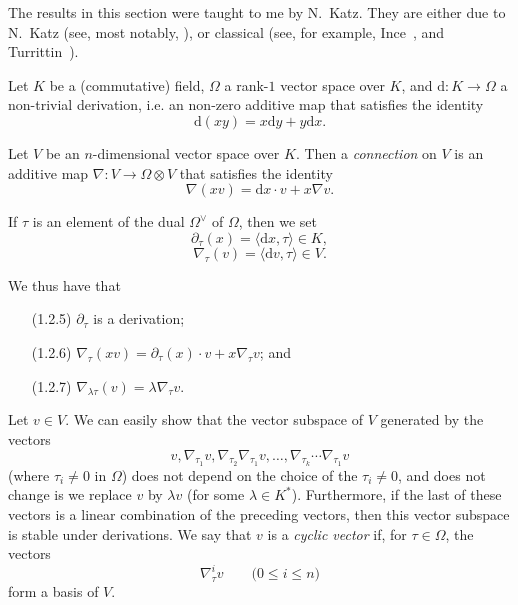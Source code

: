 \documentclass{report}
\theoremstyle{plain}
\theoremstyle{definition}
\newenvironment{env}[1]
    {\renewcommand\theinnercustomenv{#1}\innercustomenv}
    {\endinnercustomenv}
\newcommand{\dd}{\mathrm{d}}
\renewcommand{\leq}{\leqslant}
\newcommand{\oldpage}[1]{\marginpar{\footnotesize$\Big\vert$ \textit{p.~#1}}}
\begin{document}
The results in this section were taught to me by N.~Katz.
They are either due to N.~Katz (see, most notably, \cite{14,15}), or classical (see, for example, Ince~\cite{13}, and Turrittin~\cite{25,26}).

\begin{env}{1.2}
\label{II.1.2}
  Let $K$ be a (commutative) field, $\Omega$ a rank-$1$ vector space over $K$, and $\dd\colon K\to\Omega$ a non-trivial derivation, i.e. an non-zero additive map that satisfies the identity
  \[
  \label{II.1.2.1}
    \dd(xy) = x\dd y + y\dd x.
  \tag{1.2.1}
  \]

  Let $V$ be an $n$-dimensional vector space over $K$.
  Then a \emph{connection} on $V$ is an additive map $\nabla\colon V\to\Omega\otimes V$ that satisfies the identity
  \[
  \label{II.1.2.2}
    \nabla(xv) = \dd x\cdot v + x\nabla v.
  \tag{1.2.2}
  \]

  If $\tau$ is an element of the dual $\Omega^\vee$ of $\Omega$, then we set
  \[
  \label{II.1.2.3}
    \partial_\tau(x) = \langle\dd x,\tau\rangle \in K,
  \tag{1.2.3}
  \]
  \[
  \label{II.1.2.4}
    \nabla_\tau(v) = \langle\dd v,\tau\rangle \in V.
  \tag{1.2.4}
  \]

\oldpage{42}
  We thus have that
  \begin{enumerate}
    \item[(1.2.5)] \label{II.1.2.5}
      $\partial_\tau$ is a derivation;
    \item[(1.2.6)] \label{II.1.2.6}
      $\nabla_\tau(xv) = \partial_\tau(x)\cdot v + x\nabla_\tau v$; and
    \item[(1.2.7)] \label{II.1.2.7}
      $\nabla_{\lambda\tau}(v) = \lambda\nabla_\tau v$.
  \end{enumerate}

  Let $v\in V$.
  We can easily show that the vector subspace of $V$ generated by the vectors
  \[
    v, \nabla_{\tau_1}v, \nabla_{\tau_2}\nabla_{\tau_1}v, \ldots, \nabla_{\tau_k}\cdots\nabla_{\tau_1} v
  \]
  (where $\tau_i\neq0$ in $\Omega$) does not depend on the choice of the $\tau_i\neq0$, and does not change is we replace $v$ by $\lambda v$ (for some $\lambda\in K^*$).
  Furthermore, if the last of these vectors is a linear combination of the preceding vectors, then this vector subspace is stable under derivations.
  We say that $v$ is a \emph{cyclic vector} if, for $\tau\in\Omega$, the vectors
  \[
    \nabla_\tau^i v
    \qquad\mbox{($0\leq i\leq n$)}
  \]
  form a basis of $V$.
\end{env}
\end{document}
